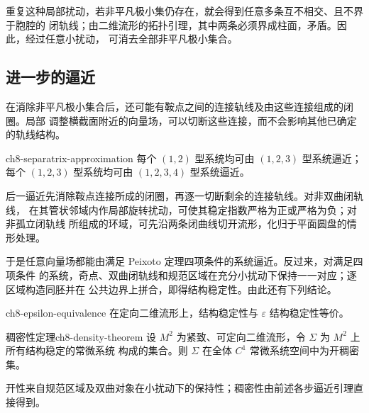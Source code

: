 
重复这种局部扰动，若非平凡极小集仍存在，就会得到任意多条互不相交、且不界于胞腔的
闭轨线；由二维流形的拓扑引理，其中两条必须界成柱面，矛盾。因此，经过任意小扰动，
可消去全部非平凡极小集合。

\subsection*{进一步的逼近}

在消除非平凡极小集合后，还可能有鞍点之间的连接轨线及由这些连接组成的闭圈。局部
调整横截面附近的向量场，可以切断这些连接，而不会影响其他已确定的轨线结构。

\begin{lemma}{}{ch8-separatrix-approximation}
每个 $(1,2)$ 型系统均可由 $(1,2,3)$ 型系统逼近；每个 $(1,2,3)$ 型系统均可由
$(1,2,3,4)$ 型系统逼近。
\end{lemma}

后一逼近先消除鞍点连接所成的闭圈，再逐一切断剩余的连接轨线。对非双曲闭轨线，
在其管状邻域内作局部旋转扰动，可使其稳定指数严格为正或严格为负；对非孤立闭轨线
所组成的环域，可先沿两条闭曲线切开流形，化归于平面圆盘的情形处理。


于是任意向量场都能由满足 Peixoto 定理四项条件的系统逼近。反过来，对满足四项条件
的系统，奇点、双曲闭轨线和规范区域在充分小扰动下保持一一对应；逐区域构造同胚并在
公共边界上拼合，即得结构稳定性。由此还有下列结论。

\begin{proposition}{}{ch8-epsilon-equivalence}
在定向二维流形上，结构稳定性与 $\varepsilon$ 结构稳定性等价。
\end{proposition}

\begin{theorem}{稠密性定理}{ch8-density-theorem}
设 $M^2$ 为紧致、可定向二维流形，令 $\Sigma$ 为 $M^2$ 上所有结构稳定的常微系统
构成的集合。则 $\Sigma$ 在全体 $C^1$ 常微系统空间中为开稠密集。
\end{theorem}

开性来自规范区域及双曲对象在小扰动下的保持性；稠密性由前述各步逼近引理直接得到。

